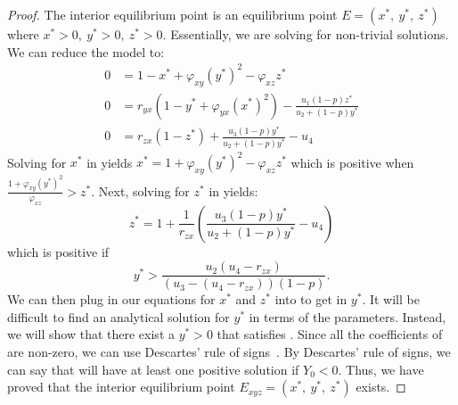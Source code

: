 \begin{proof}
    The interior equilibrium point is an equilibrium point $E=\left(x^*,\ y^*,\ z^*\right)$ where $x^*>0,\ y^*>0,\ z^*>0$.
    Essentially, we are solving  for non-trivial solutions.
    We can reduce the model to:
    \begin{subequations}\label{system:interior}
        \begin{align}
            0 &= 1-x^*+\varphi_{xy}\left(y^*\right)^2-\varphi_{xz}z^* \label{eq:interior-x}\\
            0 &= r_{yx}\left(1-y^*+\varphi_{yx}\left(x^*\right)^2\right)-\frac{u_1\left(1-p\right)z^*}{u_2+\left(1-p\right)y^*} \label{eq:interior-y}\\
            0 &= r_{zx}\left(1-z^*\right)+\frac{u_3\left(1-p\right)y^*}{u_2+\left(1-p\right)y^*}-u_4 \label{eq:interior-z}
        \end{align}
    \end{subequations}
    Solving for $x^*$ in  yields $x^*=1+\varphi_{xy}\left(y^*\right)^2-\varphi_{xz}z^*$ which is positive when $\frac{1+\varphi_{xy}\left(y^*\right)^2}{\varphi_{xz}}>z^*$.
    Next, solving for $z^*$ in  yields:
    \begin{equation*}
        z^*=1+\frac{1}{r_{zx}}\left(\frac{u_3\left(1-p\right)y^*}{u_2+\left(1-p\right)y^*}-u_4\right)
    \end{equation*}
    which is positive if
    \begin{equation*}
        y^*>\frac{u_2\left(u_4-r_{zx}\right)}{\left(u_3-\left(u_4-r_{zx}\right)\right)\left(1-p\right)}.
    \end{equation*}
    We can then plug in our equations for $x^*$ and $z^*$ into  to get  in $y^*$.
    It will be difficult to find an analytical solution for $y^*$ in terms of the parameters.
    Instead, we will show that there exist a $y^*>0$ that satisfies .
    Since all the coefficients of  are non-zero, we can use Descartes' rule of signs~\cite{WANG2004525526}.
    By Descartes' rule of signs, we can say that  will have at least one positive solution if $Y_0<0$.
    Thus, we have proved that the interior equilibrium point $E_{xyz}=\left(x^*,\ y^*,\ z^*\right)$ exists.
\end{proof}
